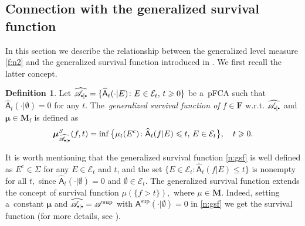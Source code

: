 \documentclass[preprint,11pt]{elsarticle}
\theoremstyle{definition}
\newtheorem{definition}[tw]{Definition}
\newcommand\bF{\mathbf{F}} %
\newcommand\bM{\mathbf{M}} %
\newcommand\bMf{\mathbf{M}_{\mathrm{f}}}%
\newcommand\cB{{\mathcal B}}
\newcommand\cE{{\mathcal E}}
\newcommand\sA{\mathsf{A}}
\newcommand\aA[2][E]{\sA(#2|#1)}%
\newcommand\aAi[3][E]{\sA^{#3}(#2|#1)}%
\newcommand\sbullet[1][.5]{\mathbin{\vcenter{\hbox{\scalebox{#1}{$\bullet$}}}}}
\newcommand\bA{\mathscr{A}}%
\newcommand\bpeA{\mathscr {A}_{\sbullet|\sbullet}}%
\newcommand\mub[1][\bA]{\mu_{#1}}
\newcommand{\bmu}{\boldsymbol{\mu}}
\renewcommand\ge{\geqslant}
\renewcommand\le{\leqslant}
\newcommand{\mI}[1]{\mathbbm{1}_{#1}}%
\begin{document}


\subsection{\textbf{Connection with the generalized survival function}}\label{sec:3.3}

In this section we describe the relationship between the generalized level measure \eqref{f:n2} and the generalized survival function introduced in \cite[formula (12)]{BHHK21}. We first recall the latter concept.

\begin{definition}
Let $\widehat{\bpeA}=\{\widehat{\sA}_t(\cdot|E)\colon E\in \cE_t,\,t\ge 0\}$  be a~pFCA such that $\widehat{\sA}_t(\cdot|\emptyset)=0$ for any $t.$ The~\textit{generalized survival function of $f\in\bF$} w.r.t. $\widehat{\bpeA}$ and $\bmu\in \bMf$ is defined as
\begin{align}\label{n:gsf}
    \bmu_{\widehat{\bpeA}}^{S}(f,t)=\inf\big\{\mu_t(E^c)\colon \widehat{\sA}_t(f|E)\le t,\, E\in \cE_t\big\}, \quad t\ge 0.
\end{align}
\end{definition}

It is worth mentioning that the generalized survival function \eqref{n:gsf} is well defined as $E^c\in \Sigma$ for any $E\in\mathcal{E}_t$ and $t$, and the set
$\{E\in \cE_t\colon \widehat{\sA}_t(f|E)\le t\}$ is nonempty for all $t,$ since $\widehat{\sA}_t(\cdot|\emptyset)=0$  and $\emptyset\in \cE_t.$
The generalized survival function extends the concept of survival function $\mu(\{f>t\}),$ where $\mu\in\bM.$
Indeed, setting a~constant $\bmu$ and $\widehat{\bpeA}=\bA^{\sup}$  with $\sA^{\sup}(\cdot|\emptyset)=0$
in \eqref{n:gsf} we get the survival function (for more details, see \cite{BHHK21}).
\end{document}
